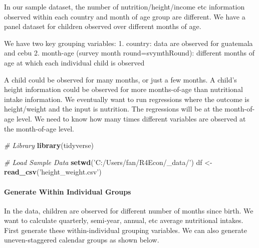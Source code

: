 \documentclass[
]{book}
\newenvironment{Shaded}{\begin{snugshade}}{\end{snugshade}}
\newcommand{\CommentTok}[1]{\textcolor[rgb]{0.56,0.35,0.01}{\textit{#1}}}
\newcommand{\KeywordTok}[1]{\textcolor[rgb]{0.13,0.29,0.53}{\textbf{#1}}}
\newcommand{\NormalTok}[1]{#1}
\newcommand{\StringTok}[1]{\textcolor[rgb]{0.31,0.60,0.02}{#1}}
\begin{document}
In our sample dataset, the number of nutrition/height/income etc information observed within each country and month of age group are different. We have a panel dataset for children observed over different months of age.

We have two key grouping variables:
1. country: data are observed for guatemala and cebu
2. month-age (survey month round=svymthRound): different months of age at which each individual child is observed

A child could be observed for many months, or just a few months. A child's height information could be observed for more months-of-age than nutritional intake information. We eventually want to run regressions where the outcome is height/weight and the input is nutrition. The regressions will be at the month-of-age level. We need to know how many times different variables are observed at the month-of-age level.

\begin{Shaded}
\begin{Highlighting}[]
\CommentTok{# Library}
\KeywordTok{library}\NormalTok{(tidyverse)}

\CommentTok{# Load Sample Data}
\KeywordTok{setwd}\NormalTok{(}\StringTok{'C:/Users/fan/R4Econ/_data/'}\NormalTok{)}
\NormalTok{df <-}\StringTok{ }\KeywordTok{read_csv}\NormalTok{(}\StringTok{'height_weight.csv'}\NormalTok{)}
\end{Highlighting}
\end{Shaded}

\hypertarget{generate-within-individual-groups}{%
\paragraph{Generate Within Individual Groups}\label{generate-within-individual-groups}}

In the data, children are observed for different number of months since birth. We want to calculate quarterly, semi-year, annual, etc average nutritional intakes. First generate these within-individual grouping variables. We can also generate uneven-staggered calendar groups as shown below.
\end{document}
